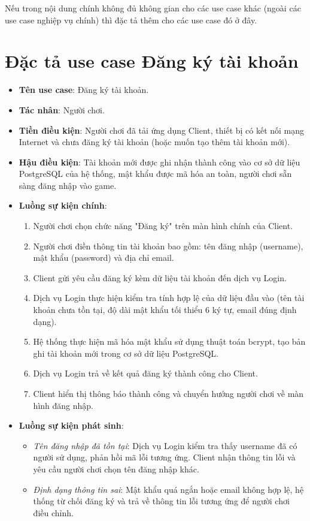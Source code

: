 \documentclass[../Project.tex]{subfiles}
\begin{document}
Nếu trong nội dung chính không đủ không gian cho các use case khác (ngoài các use case nghiệp vụ chính) thì đặc tả thêm cho các use case đó ở đây.

\section{Đặc tả use case Đăng ký tài khoản}
\label{sec:spec_register}
\begin{itemize}
    \item \textbf{Tên use case}: Đăng ký tài khoản.
    \item \textbf{Tác nhân}: Người chơi.
    \item \textbf{Tiền điều kiện}: Người chơi đã tải ứng dụng Client, thiết bị có kết nối mạng Internet và chưa đăng ký tài khoản (hoặc muốn tạo thêm tài khoản mới).
    \item \textbf{Hậu điều kiện}: Tài khoản mới được ghi nhận thành công vào cơ sở dữ liệu PostgreSQL của hệ thống, mật khẩu được mã hóa an toàn, người chơi sẵn sàng đăng nhập vào game.
    \item \textbf{Luồng sự kiện chính}:
    \begin{enumerate}
        \item Người chơi chọn chức năng "Đăng ký" trên màn hình chính của Client.
        \item Người chơi điền thông tin tài khoản bao gồm: tên đăng nhập (username), mật khẩu (password) và địa chỉ email.
        \item Client gửi yêu cầu đăng ký kèm dữ liệu tài khoản đến dịch vụ Login.
        \item Dịch vụ Login thực hiện kiểm tra tính hợp lệ của dữ liệu đầu vào (tên tài khoản chưa tồn tại, độ dài mật khẩu tối thiểu 6 ký tự, email đúng định dạng).
        \item Hệ thống thực hiện mã hóa mật khẩu sử dụng thuật toán bcrypt, tạo bản ghi tài khoản mới trong cơ sở dữ liệu PostgreSQL.
        \item Dịch vụ Login trả về kết quả đăng ký thành công cho Client.
        \item Client hiển thị thông báo thành công và chuyển hướng người chơi về màn hình đăng nhập.
    \end{enumerate}
    \item \textbf{Luồng sự kiện phát sinh}:
    \begin{itemize}
        \item \textit{Tên đăng nhập đã tồn tại}: Dịch vụ Login kiểm tra thấy username đã có người sử dụng, phản hồi mã lỗi tương ứng. Client nhận thông tin lỗi và yêu cầu người chơi chọn tên đăng nhập khác.
        \item \textit{Định dạng thông tin sai}: Mật khẩu quá ngắn hoặc email không hợp lệ, hệ thống từ chối đăng ký và trả về thông tin lỗi tương ứng để người chơi điều chỉnh.
    \end{itemize}
\end{itemize}
\end{document}
